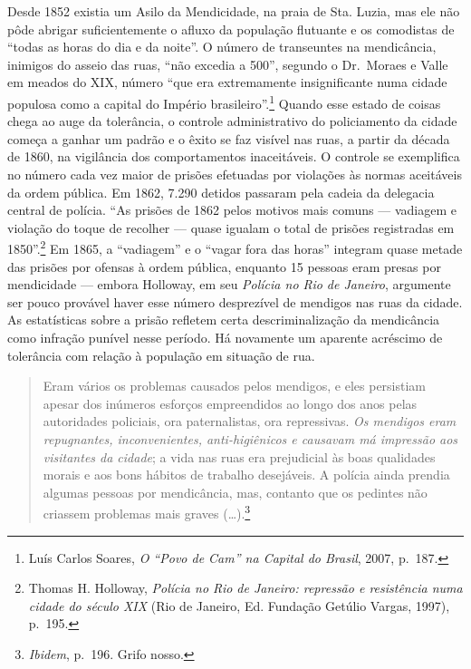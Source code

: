 Desde 1852 existia um Asilo da Mendicidade, na praia de Sta. Luzia, mas
ele não pôde abrigar suficientemente o afluxo da população flutuante e
os comodistas de ``todas as horas do dia e da noite''. O número de
transeuntes na mendicância, inimigos do asseio das ruas, ``não excedia a
500'', segundo o Dr.~Moraes e Valle em meados do XIX, número ``que era
extremamente insignificante numa cidade populosa como a capital do
Império brasileiro''.\footnote{Luís Carlos Soares, \textit{O ``Povo de
  Cam'' na Capital do Brasil}, 2007, p.~187.} Quando esse estado de
coisas chega ao auge da tolerância, o controle administrativo do
policiamento da cidade começa a ganhar um padrão e o êxito se faz
visível nas ruas, a partir da década de 1860, na vigilância dos
comportamentos inaceitáveis. O controle se exemplifica no número cada
vez maior de prisões efetuadas por violações às normas aceitáveis da
ordem pública. Em 1862, 7.290 detidos passaram pela cadeia da delegacia
central de polícia. ``As prisões de 1862 pelos motivos mais comuns ---
vadiagem e violação do toque de recolher --- quase igualam o total de
prisões registradas em 1850''.\footnote{Thomas H. Holloway,
  \textit{Polícia no Rio de Janeiro: repressão e resistência numa cidade
  do século XIX} (Rio de Janeiro, Ed. Fundação Getúlio Vargas, 1997),
  p.~195.} Em 1865, a ``vadiagem'' e o ``vagar fora das horas'' integram
quase metade das prisões por ofensas à ordem pública, enquanto 15
pessoas eram presas por mendicidade --- embora Holloway, em seu
\textit{Polícia no Rio de Janeiro}, argumente ser pouco provável haver
esse número desprezível de mendigos nas ruas da cidade. As estatísticas
sobre a prisão refletem certa descriminalização da mendicância como
infração punível nesse período. Há novamente um aparente acréscimo de
tolerância com relação à população em situação de rua.

\begin{quote}
Eram vários os problemas causados pelos mendigos, e eles persistiam
apesar dos inúmeros esforços empreendidos ao longo dos anos pelas
autoridades policiais, ora paternalistas, ora repressivas. \textit{Os
mendigos eram repugnantes, inconvenientes, anti-higiênicos e causavam má
impressão aos visitantes da cidade}; a vida nas ruas era prejudicial às
boas qualidades morais e aos bons hábitos de trabalho desejáveis. A
polícia ainda prendia algumas pessoas por mendicância, mas, contanto que
os pedintes não criassem problemas mais graves (\dots{}).\footnote{\textit{Ibidem},
  p.~196. Grifo nosso.}
\end{quote}


